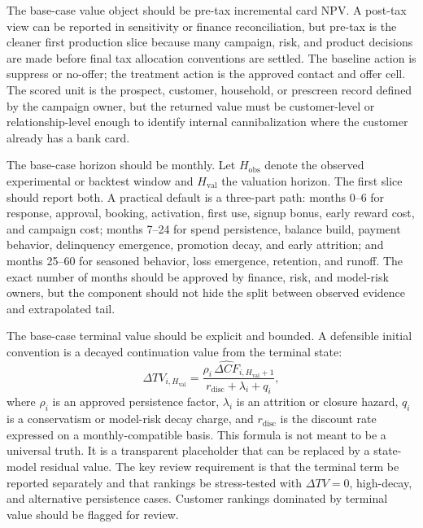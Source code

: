 \documentclass[11pt]{article}
\newcommand{\1}{\mathbf{1}}
\begin{document}
The base-case value object should be pre-tax incremental card NPV. A post-tax
view can be reported in sensitivity or finance reconciliation, but pre-tax is
the cleaner first production slice because many campaign, risk, and product
decisions are made before final tax allocation conventions are settled. The
baseline action is suppress or no-offer; the treatment action is the approved
contact and offer cell. The scored unit is the prospect, customer, household,
or prescreen record defined by the campaign owner, but the returned value must
be customer-level or relationship-level enough to identify internal
cannibalization where the customer already has a bank card.

The base-case horizon should be monthly. Let $H_{\mathrm{obs}}$ denote the
observed experimental or backtest window and $H_{\mathrm{val}}$ the valuation
horizon. The first slice should report both. A practical default is a
three-part path: months 0--6 for response, approval, booking, activation,
first use, signup bonus, early reward cost, and campaign cost; months 7--24
for spend persistence, balance build, payment behavior, delinquency emergence,
promotion decay, and early attrition; and months 25--60 for seasoned behavior,
loss emergence, retention, and runoff. The exact number of months should be
approved by finance, risk, and model-risk owners, but the component should not
hide the split between observed evidence and extrapolated tail.

The base-case terminal value should be explicit and bounded. A defensible
initial convention is a decayed continuation value from the terminal state:
\begin{equation}
  \Delta TV_{i,H_{\mathrm{val}}}
  =
  \frac{\rho_i \, \widehat{\Delta CF}_{i,H_{\mathrm{val}}+1}}
       {r_{\mathrm{disc}}+\lambda_i+q_i},
  \label{eq:terminal-value-base}
\end{equation}
where $\rho_i$ is an approved persistence factor, $\lambda_i$ is an attrition
or closure hazard, $q_i$ is a conservatism or model-risk decay charge, and
$r_{\mathrm{disc}}$ is the discount rate expressed on a monthly-compatible
basis. This formula is not meant to be a universal truth. It is a transparent
placeholder that can be replaced by a state-model residual value. The key
review requirement is that the terminal term be reported separately and that
rankings be stress-tested with $\Delta TV=0$, high-decay, and alternative
persistence cases. Customer rankings dominated by terminal value should be
flagged for review.
\end{document}

